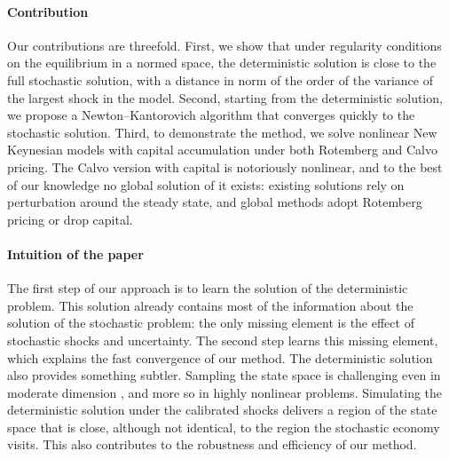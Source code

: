\documentclass[12pt]{article}
\begin{document}
\paragraph{Contribution} Our contributions are threefold. First, we show that under regularity
conditions on the equilibrium in a normed space, the deterministic solution
is close to the full stochastic solution, with a distance in norm of the
order of the variance of the largest shock in the model. Second,
starting from the deterministic solution, we propose a Newton--Kantorovich
algorithm that converges quickly to the stochastic solution. Third, to demonstrate
the method, we solve nonlinear New Keynesian models with capital accumulation under
both Rotemberg and Calvo pricing. The Calvo version with capital is notoriously nonlinear, and to the
best of our knowledge no global solution of it exists: existing solutions rely
on perturbation around the steady state, and global methods adopt Rotemberg
pricing or drop capital.

\paragraph{Intuition of the paper} The first step of our approach is to
learn the solution of the deterministic problem. This solution already contains
most of the information about the solution of the stochastic problem: the only
missing element is the effect of stochastic shocks and uncertainty. The second step learns this missing
element, which explains the fast convergence of our method.
The deterministic solution also provides something subtler.
Sampling the state space is challenging even in moderate
dimension \citep{kahou2021exploiting, fernandez2026taming}, and more so in highly nonlinear problems. Simulating the
deterministic solution under the calibrated shocks delivers a region of the state space that is close, although not identical, to
the region the stochastic economy visits.
This also contributes to the robustness and efficiency of our method.
\end{document}
